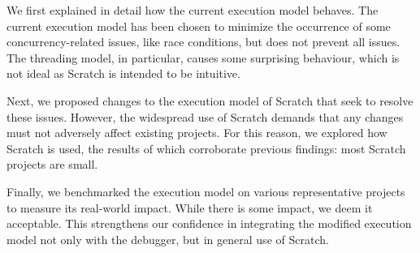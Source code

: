 \documentclass[main]{subfiles}
\begin{document}
We first explained in detail how the current execution model behaves.
The current execution model has been chosen to minimize the occurrence of some concurrency-related issues, like race conditions, but does not prevent all issues.
The threading model, in particular, causes some surprising behaviour, which is not ideal as Scratch is intended to be intuitive.

Next, we proposed changes to the execution model of Scratch that seek to resolve these issues.
However, the widespread use of Scratch demands that any changes must not adversely affect existing projects.
For this reason, we explored how Scratch is used, the results of which corroborate previous findings: most Scratch projects are small.

Finally, we benchmarked the execution model on various representative projects to measure its real-world impact.
While there is some impact, we deem it acceptable.
This strengthens our confidence in integrating the modified execution model not only with the debugger, but in general use of Scratch.
\end{document}
